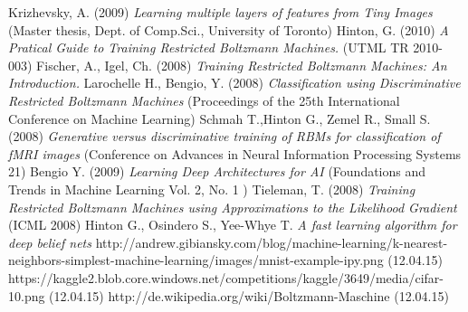 \documentclass[a4paper]{scrartcl}
\begin{document}
\newpage

\begin{thebibliography}{9}
    Krizhevsky, A. (2009) \emph{Learning multiple layers of features 	from Tiny Images} (Master thesis, Dept. of Comp.Sci., University of Toronto)
    Hinton, G. (2010) \emph{A Pratical Guide to Training Restricted 			Boltzmann Machines.} (UTML TR 2010-003)
    Fischer, A., Igel, Ch. (2008) \emph{Training Restricted Boltzmann 		Machines: An Introduction.} 
    Larochelle H., Bengio, Y. (2008) \emph {Classification using 			Discriminative Restricted Boltzmann Machines} (Proceedings of the 25th International 			Conference on Machine Learning)
    Schmah T.,Hinton G., Zemel R., Small S. (2008) \emph{Generative 			versus discriminative training of RBMs
	for classification of fMRI images} (Conference on Advances in Neural Information 				Processing Systems 21)
    Bengio Y. (2009) \emph {Learning Deep Architectures for AI} 				(Foundations and Trends in Machine Learning
	Vol. 2, No. 1 )
    Tieleman, T. (2008) \emph{Training Restricted Boltzmann Machines 		using Approximations to
	the Likelihood Gradient} (ICML 2008)	
    Hinton G., Osindero S., Yee-Whye T. \emph {A fast learning 			algorithm for deep belief nets}
    http://andrew.gibiansky.com/blog/machine-learning/k-nearest-		neighbors-simplest-machine-learning/images/mnist-example-ipy.png (12.04.15)
    https://kaggle2.blob.core.windows.net/competitions/kaggle/3649/media/cifar-10.png (12.04.15)
    http://de.wikipedia.org/wiki/Boltzmann-Maschine (12.04.15)
\end{thebibliography}
\end{document}
